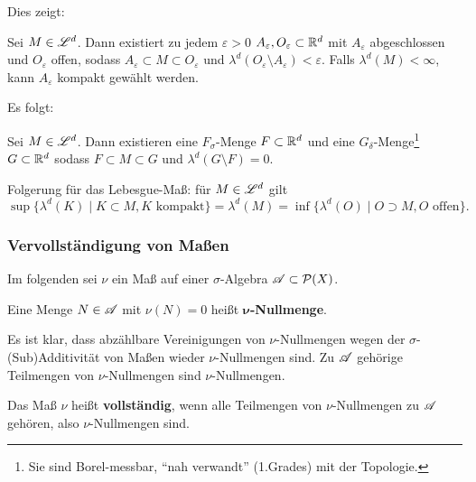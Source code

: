 Dies zeigt:

\begin{satz}
\begin{mdframed}
Sei $M \in \LL^d$. Dann existiert zu jedem $\varepsilon>0$ $A_\varepsilon, O_\varepsilon \subset \R^d$ mit $A_\varepsilon$ abgeschlossen und $O_\varepsilon$ offen, sodass
${A_\varepsilon} \subset M \subset {O_\varepsilon}$
und 
$\lambda^d(O_\varepsilon \setminus A_\varepsilon) < \varepsilon$.
Falls $\lambda^d(M)<\infty$, kann $A_\varepsilon$ kompakt gewählt werden.
\end{mdframed}
\end{satz}

Es folgt:
\begin{satz}
\begin{mdframed}
Sei $M\in \LL^d$. Dann existieren eine $F_\sigma$-Menge $F\subset \R^d$ und eine $G_\delta$-Menge\footnote{Sie sind Borel-messbar, ``nah verwandt'' (1.Grades) mit der Topologie.}  $G\subset \R^d$ sodass $F\subset M \subset G$ und $\lambda^d(G\setminus F)=0$.
\end{mdframed}
\end{satz}

Folgerung für das Lebesgue-Maß: für $M\in \LL^d$ gilt
$$
\boxed{\sup\{\lambda^d(K) \mid K \subset M, K \text{ kompakt}\} = \lambda^d(M)=\inf \{\lambda^d(O)\mid O \supset M, O \text{ offen}\}}.
$$

\subsubsection{Vervollständigung von Maßen}
Im folgenden sei $\nu$ ein Maß auf einer $\sigma$-Algebra $\AA \subset \PP(X)$.

\begin{definition}
\begin{mdframed}
Eine Menge $N\in \AA$ mit $\nu(N)=0$ heißt \textbf{$\boldsymbol{\nu}$-Nullmenge}.
\end{mdframed}
\end{definition}
Es ist klar, dass abzählbare Vereinigungen von $\nu$-Nullmengen wegen der $\sigma$-(Sub)Additivität von Maßen wieder $\nu$-Nullmengen sind. Zu $\AA$ gehörige Teilmengen von $\nu$-Nullmengen sind $\nu$-Nullmengen.

\begin{definition}
\begin{mdframed}
Das Maß $\nu$ heißt \textbf{vollständig}, wenn alle Teilmengen von $\nu$-Nullmengen zu $\AA$ gehören, also $\nu$-Nullmengen sind.
\end{mdframed}
\end{definition}

